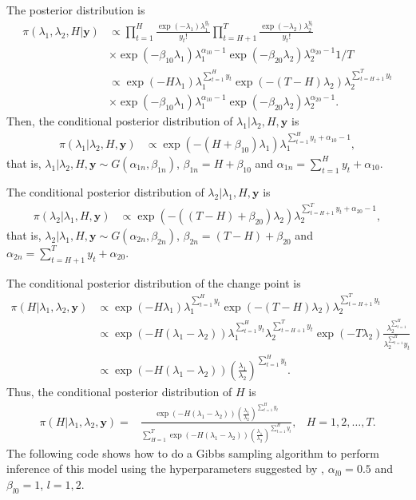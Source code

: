 The posterior distribution is
\begin{align*}
	\pi(\lambda_1,\lambda_2,H|\bm{y})&\propto \prod_{t=1}^{H} \frac{\exp(-\lambda_1)\lambda_1^{y_t}}{y_t!} \prod_{t=H+1}^{T}\frac{\exp(-\lambda_2)\lambda_2^{y_t}}{y_t!}\\
	&\times \exp(-\beta_{10}\lambda_1)\lambda_1^{\alpha_{10}-1} \exp(-\beta_{20}\lambda_2)\lambda_2^{\alpha_{20}-1} 1/T\\
	&\propto\exp(-H\lambda_1)\lambda_1^{\sum_{t=1}^H y_t}\exp(-(T-H)\lambda_2)\lambda_2^{\sum_{t=H+1}^T y_t}\\
	&\times \exp(-\beta_{10}\lambda_1)\lambda_1^{\alpha_{10}-1} \exp(-\beta_{20}\lambda_2)\lambda_2^{\alpha_{20}-1}.
\end{align*} 
Then, the conditional posterior distribution of $\lambda_1|\lambda_2,H,\bm{y}$ is 
\begin{align*}
	\pi(\lambda_1|\lambda_2,H,\bm{y})&\propto\exp(-(H+\beta_{10})\lambda_1)\lambda_1^{\sum_{t=1}^H y_t+\alpha_{10}-1},
\end{align*} 
that is, $\lambda_1|\lambda_2,H,\bm{y}\sim G(\alpha_{1n},\beta_{1n})$, $\beta_{1n}=H+\beta_{10}$ and $\alpha_{1n}=\sum_{t=1}^H y_t+\alpha_{10}$.

The conditional posterior distribution of $\lambda_2|\lambda_1,H,\bm{y}$ is 
\begin{align*}
	\pi(\lambda_2|\lambda_1,H,\bm{y})&\propto\exp(-((T-H)+\beta_{20})\lambda_2)\lambda_2^{\sum_{t=H+1}^T y_t+\alpha_{20}-1},
\end{align*} 
that is, $\lambda_2|\lambda_1,H,\bm{y}\sim G(\alpha_{2n},\beta_{2n})$, $\beta_{2n}=(T-H)+\beta_{20}$ and $\alpha_{2n}=\sum_{t=H+1}^T y_t+\alpha_{20}$.

The conditional posterior distribution of the change point is
\begin{align*}
	\pi(H|\lambda_1,\lambda_2,\bm{y})&\propto\exp(-H\lambda_1)\lambda_1^{\sum_{t=1}^H y_t}\exp(-(T-H)\lambda_2)\lambda_2^{\sum_{t=H+1}^T y_t}\\
	&\propto \exp(-H(\lambda_1-\lambda_2))\lambda_1^{\sum_{t=1}^H y_t}\lambda_2^{\sum_{t=H+1}^T y_t} \exp(-T\lambda_2) \frac{\lambda_2^{\sum_{t=1}^H}}{\lambda_2^{\sum_{t=1}^H} y_t}\\
	&\propto \exp(-H(\lambda_1-\lambda_2))\left(\frac{\lambda_1}{\lambda_2}\right)^{\sum_{t=1}^H y_t}.
\end{align*} 
Thus, the conditional posterior distribution of $H$ is
\begin{align*}
	\pi(H|\lambda_1,\lambda_2,\bm{y})=& \frac{\exp(-H(\lambda_1-\lambda_2))\left(\frac{\lambda_1}{\lambda_2}\right)^{\sum_{t=1}^H y_t}}{\sum_{H=1}^T \exp(-H(\lambda_1-\lambda_2))\left(\frac{\lambda_1}{\lambda_2}\right)^{\sum_{t=1}^H y_t}}, & H=1,2,\dots,T.
\end{align*}
The following code shows how to do a Gibbs sampling algorithm to perform inference of this model using the hyperparameters suggested by \cite[Chap.~7]{greenberg2012introduction}, $\alpha_{l0}=0.5$ and $\beta_{l0}=1$, $l=1,2$.

